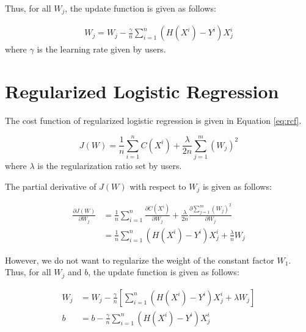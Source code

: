 \documentclass[conference]{IEEEtran}
\begin{document}
Thus, for all $W_{j}$, the update function is given as follows:

\begin{align*}
	W_{j}=W_{j}-\frac{\gamma}{n}\sum_{i=1}^{n}(H(X^{i})-Y^{i})X^{i}_{j}
\end{align*}
where $\gamma$ is the learning rate given by users.

\section{Regularized Logistic Regression}
The cost function of regularized logistic regression is given in Equation \eqref{eq:rcf}.

\begin{equation}
\label{eq:rcf}
	J(W)=\frac{1}{n}\sum_{i=1}^{n}C(X^{i})+\frac{\lambda}{2n}\sum_{j=1}^{m}(W_{j})^{2}
\end{equation}
where $\lambda$ is the regularization ratio set by users.

The partial derivative of $J(W)$ with respect to $W_{j}$ is given as follows:

\begin{align*}
	\frac{\partial{J(W)}}{\partial{W_{j}}}
	&=\frac{1}{n}\sum_{i=1}^{n}\frac{\partial{C(X^{i})}}{\partial{W_{j}}}+\frac{\lambda}{2n}\frac{\partial{\sum_{j=1}^{m}(W_{j})^{2}}}{\partial{W_{j}}}\\
	&=\frac{1}{n}\sum_{i=1}^{n}(H(X^{i})-Y^{i})X^{i}_{j}+\frac{\lambda}{n}W_{j}
\end{align*}

However, we do not want to regularize the weight of the constant factor $W_{1}$. Thus, for all $W_{j}$ and $b$, the update function is given as follows:

\begin{align*}
	W_{j}&=W_{j}-\frac{\gamma}{n}[\sum_{i=1}^{n}(H(X^{i})-Y^{i})X^{i}_{j}+\lambda W_{j}]\\
	b&=b-\frac{\gamma}{n}\sum_{i=1}^{n}(H(X^{i})-Y^{i})X^{i}_{j}
\end{align*}
\end{document}
